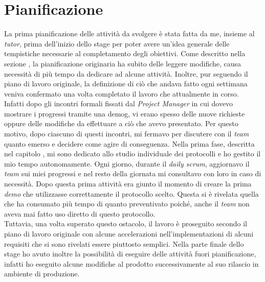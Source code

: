 \section{Pianificazione}
La prima pianificazione delle attività da svolgere è stata fatta da me, insieme al \textit{tutor}, prima dell'inizio dello stage per poter avere un'idea generale delle tempistiche necessarie al completamento degli obiettivi. Come descritto nella sezione , la pianificazione originaria ha subito delle leggere modifiche, causa necessità di più tempo da dedicare ad alcune attività. Inoltre, pur seguendo il piano di lavoro originale, la definizione di ciò che andava fatto ogni settimana veniva confermato una volta completato il lavoro che attualmente in corso.\\
Infatti dopo gli incontri formali fissati dal \textit{Project Manager} in cui dovevo mostrare i progressi tramite una \gls{demog}, vi erano spesso delle nuove richieste oppure delle modifiche da effettuare a ciò che avevo presentato. Per questo motivo, dopo ciascuno di questi incontri, mi fermavo per discutere con il \textit{team} quanto emerso e decidere come agire di conseguenza. Nella prima fase, descritta nel capitolo , mi sono dedicato allo studio individuale dei protocolli e ho gestito il mio tempo autonomamente. Ogni giorno, durante il \textit{daily scrum}, aggiornavo il \textit{team} sui miei progressi e nel resto della giornata mi consultavo con loro in caso di necessità. Dopo questa prima attività era giunto il momento di creare la prima \textit{demo} che utilizzasse correttamente il protocollo scelto. Questa si è rivelata quella che ha consumato più tempo di quanto preventivato poiché, anche il \textit{team} non aveva mai fatto uso diretto di questo protocollo.\\
Tuttavia, una volta superato questo ostacolo, il lavoro è proseguito secondo il piano di lavoro originale con alcune accelerazioni nell'implementazioni di alcuni requisiti che si sono rivelati essere piuttosto semplici. Nella parte finale dello stage ho avuto inoltre la possibilità di eseguire delle attività fuori pianificazione, infatti ho eseguito alcune modifiche al prodotto successivamente al suo rilascio in ambiente di produzione.


